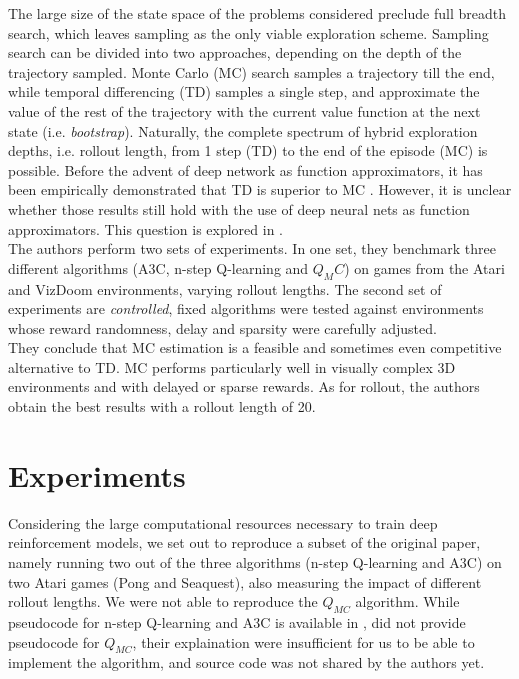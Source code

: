 \documentclass{article}
\begin{document}
The large size of the state space of the problems considered preclude full breadth
search, which leaves sampling as the only viable exploration scheme. Sampling
search can be divided into two approaches, depending on the depth of the trajectory
sampled. Monte Carlo (MC) search samples a trajectory till the end, while temporal
differencing (TD) samples a single step, and approximate the value of the rest of the
trajectory with the current value function at the next state (i.e. \emph{bootstrap}).
Naturally, the complete spectrum of hybrid exploration depths, i.e. rollout length,
from 1 step (TD) to the end of the episode (MC) is possible.
Before the advent of deep network as function approximators, it has been empirically
demonstrated that TD is superior to MC \citep{sutton1995}. However, it is unclear
whether those results still hold with the use of deep neural nets as function approximators.
This question is explored in \citep{amiranashvili2018analyzing}. \\

The authors perform two sets of experiments. In one set, they benchmark three different
algorithms (A3C, n-step Q-learning and $Q_MC$) on games from the Atari and VizDoom environments,
varying rollout lengths. The second set of experiments are \emph{controlled}, fixed algorithms
were tested against environments whose reward randomness, delay and sparsity were
carefully adjusted.\\

They conclude that MC estimation is a feasible and sometimes even competitive alternative
to TD. MC performs particularly well in visually complex 3D environments
and with delayed or sparse rewards. As for rollout, the authors obtain the
best results with a rollout length of 20.

\pagebreak

\section{Experiments}

Considering the large computational resources necessary to train deep reinforcement models,
we set out to reproduce a subset of the original paper, namely running two out of the three
algorithms (n-step Q-learning and A3C) on two Atari games (Pong and Seaquest),
also measuring the impact of different rollout lengths. We were not able to reproduce
the $Q_{MC}$ algorithm. While pseudocode for n-step Q-learning and A3C is available in
\cite{pmlr-v48-mniha16}, \cite{amiranashvili2018analyzing} did not provide pseudocode
for $Q_{MC}$, their explaination were insufficient for us to be able to implement the
algorithm, and source code was not shared by the authors yet. \\
\end{document}
